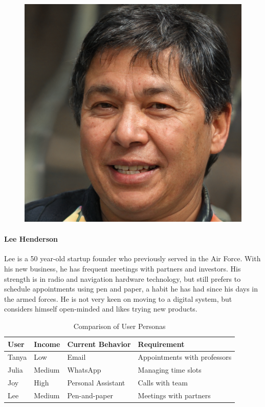 \documentclass{article}
\begin{document}
\begin{figure}
	\includegraphics[scale=0.1]{persona-lee.jpg}
\end{figure}

\paragraph{Lee Henderson}

Lee is a 50 year-old startup founder who previously served in the Air Force. With his new business, he has frequent meetings with partners and investors.  His strength is in radio and navigation hardware technology, but still prefers to schedule appointments using pen and paper, a habit he has had since his days in the armed forces. He is not very keen on moving to a digital system, but considers himself open-minded and likes trying new products.

\begin{table}[!htb]
	\begin{minipage}{1\linewidth}
		\caption{Comparison of User Personas}
		\centering
		\begin{tabular}{llll}
			\hline
			\textbf{User} & \textbf{Income} & \textbf{Current Behavior} & \textbf{Requirement}         \\
			\hline
			Tanya         & Low             & Email & Appointments with professors \\
			Julia         & Medium          & WhatsApp & Managing time slots          \\
			Joy           & High            & Personal Assistant & Calls with team              \\
			Lee           & Medium          & Pen-and-paper & Meetings with partners       \\
			\hline
		\end{tabular}
	\end{minipage}%
\end{table}
\end{document}
